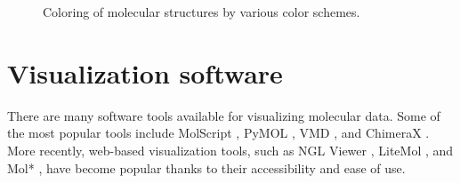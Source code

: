 \documentclass[
  digital,     %
  oneside,     %
  nosansbold,  %
  nocolorbold, %
  lof,         %
  lot,         %
]{fithesis4}
\begin{document}
\begin{figure}[htbp]
  \centering
  \caption{Coloring of molecular structures by various color schemes.}
  \label{fig:coloring}
\end{figure}

\section{Visualization software}
\label{section:visualization_software}

There are many software tools available for visualizing molecular data. Some of the most popular tools include MolScript \cite{kraulis1991molscript}, PyMOL \cite{delano2002pymol}, VMD \cite{humphrey1996vmd}, and ChimeraX \cite{goddard2018ucsf}. More recently, web-based visualization tools, such as NGL Viewer \cite{rose2015ngl}, LiteMol \cite{sehnal2017litemol}, and Mol* \cite{sehnal2021molstar}, have become popular thanks to their accessibility and ease of use.
\end{document}
